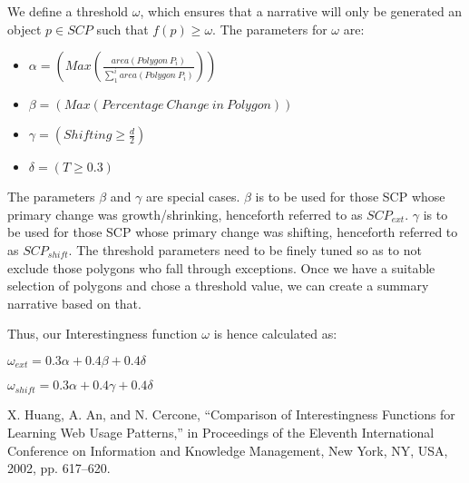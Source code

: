 \documentclass[conference]{IEEEtran}
\begin{document}
We define a threshold $\omega$, which ensures that a narrative will only be generated an object $p \in SCP$ such that $f(p) \ge \omega$. The parameters for $\omega$ are:

\begin{itemize}
\item $\alpha = (Max\left(\frac{area\left(Polygon\ P_i\right)}{\sum_{1}^{i}area\left(Polygon\ P_i\right)}\right))$
\item $\beta = (Max\left(Percentage\ Change\ in\ Polygon\right))$
\item $\gamma = (Shifting \geq \frac{d}{2})$
\item $\delta = (T \geq 0.3)$
\end{itemize}

The parameters $\beta$ and $\gamma$ are special cases. $\beta$ is to be used for those SCP whose primary change was growth/shrinking, henceforth referred to as $SCP_{ext}$. $\gamma$ is to be used for those SCP whose primary change was shifting, henceforth referred to as $SCP_{shift}$. The threshold parameters need to be finely tuned so as to not exclude those polygons who fall through exceptions. Once we have a suitable selection of polygons and chose a threshold value, we can create a summary narrative based on that.

Thus, our Interestingness function $\omega$ is hence calculated as:

$\omega_{ext} = 0.3\alpha + 0.4\beta + 0.4\delta$

$\omega_{shift} = 0.3\alpha + 0.4\gamma + 0.4\delta$


\newpage
\begin{thebibliography}{12}

  
 X. Huang, A. An, and N. Cercone, “Comparison of Interestingness Functions for Learning Web Usage Patterns,” in Proceedings of the Eleventh International Conference on Information and Knowledge Management, New York, NY, USA, 2002, pp. 617–620.

\end{thebibliography}
\end{document}
